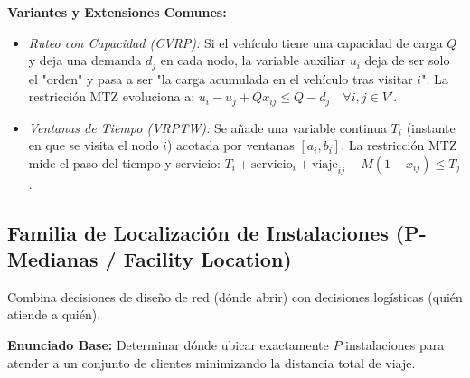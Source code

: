 \documentclass{article}
\begin{document}
	\textbf{Variantes y Extensiones Comunes:}
	\begin{itemize}
		\item \textit{Ruteo con Capacidad (CVRP):} Si el vehículo tiene una capacidad de carga $Q$ y deja una demanda $d_j$ en cada nodo, la variable auxiliar $u_i$ deja de ser solo el "orden" y pasa a ser "la carga acumulada en el vehículo tras visitar $i$". La restricción MTZ evoluciona a: $u_i - u_j + Q x_{ij} \leq Q - d_j \quad \forall i, j \in V'$.
		\item \textit{Ventanas de Tiempo (VRPTW):} Se añade una variable continua $T_i$ (instante en que se visita el nodo $i$) acotada por ventanas $[a_i, b_i]$. La restricción MTZ mide el paso del tiempo y servicio: $T_i + \text{servicio}_i + \text{viaje}_{ij} - M(1-x_{ij}) \leq T_j$.
	\end{itemize}
	
	\newpage
	
	\subsection{Familia de Localización de Instalaciones (P-Medianas / Facility Location)}
	Combina decisiones de diseño de red (dónde abrir) con decisiones logísticas (quién atiende a quién).
	
	\textbf{Enunciado Base:} Determinar dónde ubicar exactamente $P$ instalaciones para atender a un conjunto de clientes minimizando la distancia total de viaje.
	
\end{document}
